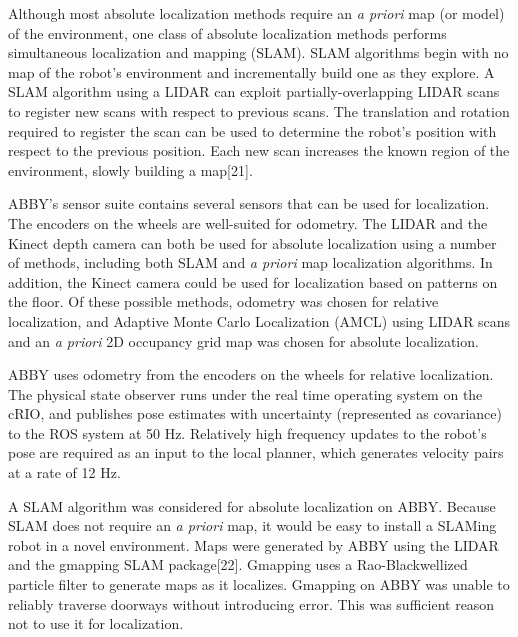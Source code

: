 \documentclass[]{cwru} %
\begin{document}
Although most absolute localization methods require an \emph{a priori}
map (or model) of the environment, one class of absolute localization
methods performs simultaneous localization and mapping (SLAM). SLAM
algorithms begin with no map of the robot's environment and
incrementally build one as they explore. A SLAM algorithm using a LIDAR
can exploit partially-overlapping LIDAR scans to register new scans with
respect to previous scans. The translation and rotation required to
register the scan can be used to determine the robot's position with
respect to the previous position. Each new scan increases the known
region of the environment, slowly building a map{[}21{]}.

ABBY's sensor suite contains several sensors that can be used for
localization. The encoders on the wheels are well-suited for odometry.
The LIDAR and the Kinect depth camera can both be used for absolute
localization using a number of methods, including both SLAM and \emph{a
priori} map localization algorithms. In addition, the Kinect camera
could be used for localization based on patterns on the floor. Of these
possible methods, odometry was chosen for relative localization, and
Adaptive Monte Carlo Localization (AMCL) using LIDAR scans and an
\emph{a priori} 2D occupancy grid map was chosen for absolute
localization.

ABBY uses odometry from the encoders on the wheels for relative
localization. The physical state observer runs under the real time
operating system on the cRIO, and publishes pose estimates with
uncertainty (represented as covariance) to the ROS system at 50 Hz.
Relatively high frequency updates to the robot's pose are required as an
input to the local planner, which generates velocity pairs at a rate of
12 Hz.

A SLAM algorithm was considered for absolute localization on ABBY.
Because SLAM does not require an \emph{a priori} map, it would be easy
to install a SLAMing robot in a novel environment. Maps were generated
by ABBY using the LIDAR and the gmapping SLAM package{[}22{]}. Gmapping
uses a Rao-Blackwellized particle filter to generate maps as it
localizes. Gmapping on ABBY was unable to reliably traverse doorways
without introducing error. This was sufficient reason not to use it for
localization.
\end{document}
